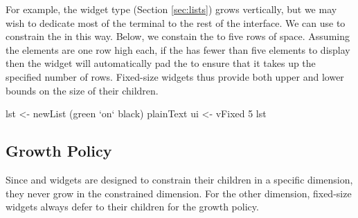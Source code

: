 For example, the  widget type (Section \ref{sec:lists}) grows
vertically, but we may wish to dedicate most of the terminal to the
rest of the interface.  We can use  to constrain the
 in this way.  Below, we constain the  to five rows
of space.  Assuming the  elements are one row high each, if
the  has fewer than five elements to display then the
 widget will automatically pad the  to ensure that
it takes up the specified number of rows.  Fixed-size widgets thus
provide both upper and lower bounds on the size of their children.

\begin{haskellcode}
 lst <- newList (green `on` black) plainText
 ui <- vFixed 5 lst
\end{haskellcode}

\subsection{Growth Policy}

Since  and  widgets are designed to constrain
their children in a specific dimension, they never grow in the
constrained dimension.  For the other dimension, fixed-size widgets
always defer to their children for the growth policy.
